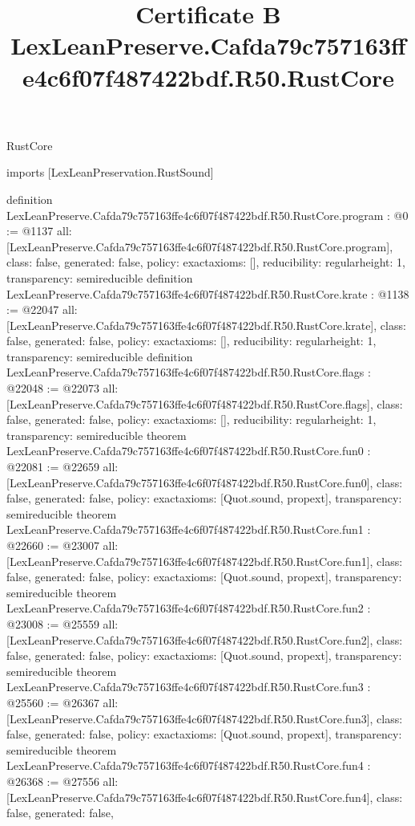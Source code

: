 \begin{lexlean}{RustCore}
\title{Certificate B LexLeanPreserve.Cafda79c757163ffe4c6f07f487422bdf.R50.RustCore}
\begin{coremodule}
imports [LexLeanPreservation.RustSound]

definition LexLeanPreserve.Cafda79c757163ffe4c6f07f487422bdf.R50.RustCore.program : @0 := @1137 {
  all: [LexLeanPreserve.Cafda79c757163ffe4c6f07f487422bdf.R50.RustCore.program],
  class: false,
  generated: false,
  policy: exact{axioms: []},
  reducibility: regular{height: 1},
  transparency: semireducible
}
definition LexLeanPreserve.Cafda79c757163ffe4c6f07f487422bdf.R50.RustCore.krate : @1138 := @22047 {
  all: [LexLeanPreserve.Cafda79c757163ffe4c6f07f487422bdf.R50.RustCore.krate],
  class: false,
  generated: false,
  policy: exact{axioms: []},
  reducibility: regular{height: 1},
  transparency: semireducible
}
definition LexLeanPreserve.Cafda79c757163ffe4c6f07f487422bdf.R50.RustCore.flags : @22048 := @22073 {
  all: [LexLeanPreserve.Cafda79c757163ffe4c6f07f487422bdf.R50.RustCore.flags],
  class: false,
  generated: false,
  policy: exact{axioms: []},
  reducibility: regular{height: 1},
  transparency: semireducible
}
theorem LexLeanPreserve.Cafda79c757163ffe4c6f07f487422bdf.R50.RustCore.fun0 : @22081 := @22659 {
  all: [LexLeanPreserve.Cafda79c757163ffe4c6f07f487422bdf.R50.RustCore.fun0],
  class: false,
  generated: false,
  policy: exact{axioms: [Quot.sound, propext]},
  transparency: semireducible
}
theorem LexLeanPreserve.Cafda79c757163ffe4c6f07f487422bdf.R50.RustCore.fun1 : @22660 := @23007 {
  all: [LexLeanPreserve.Cafda79c757163ffe4c6f07f487422bdf.R50.RustCore.fun1],
  class: false,
  generated: false,
  policy: exact{axioms: [Quot.sound, propext]},
  transparency: semireducible
}
theorem LexLeanPreserve.Cafda79c757163ffe4c6f07f487422bdf.R50.RustCore.fun2 : @23008 := @25559 {
  all: [LexLeanPreserve.Cafda79c757163ffe4c6f07f487422bdf.R50.RustCore.fun2],
  class: false,
  generated: false,
  policy: exact{axioms: [Quot.sound, propext]},
  transparency: semireducible
}
theorem LexLeanPreserve.Cafda79c757163ffe4c6f07f487422bdf.R50.RustCore.fun3 : @25560 := @26367 {
  all: [LexLeanPreserve.Cafda79c757163ffe4c6f07f487422bdf.R50.RustCore.fun3],
  class: false,
  generated: false,
  policy: exact{axioms: [Quot.sound, propext]},
  transparency: semireducible
}
theorem LexLeanPreserve.Cafda79c757163ffe4c6f07f487422bdf.R50.RustCore.fun4 : @26368 := @27556 {
  all: [LexLeanPreserve.Cafda79c757163ffe4c6f07f487422bdf.R50.RustCore.fun4],
  class: false,
  generated: false,
}
\end{coremodule}
\end{lexlean}
